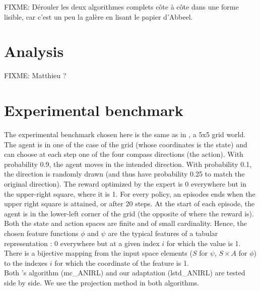 \documentclass{article}
\begin{document}

FIXME: Dérouler les deux algorithmes complets côte à côte dans une forme lisible, car c'est un peu la galère en lisant le papier d'Abbeel.
\section{Analysis}
FIXME: Matthieu ?
\section{Experimental benchmark}
The experimental benchmark chosen here is the same as in \citep{ng2000algorithms}, a 5x5 grid world. The agent is in one of the case of the grid (whose coordinates is the state) and can choose at each step one of the four compass directions (the action). With probability 0.9, the agent moves in the intended direction. With probability 0.1, the direction is randomly drawn (and thus have probability 0.25 to match the original direction). The reward optimized by the expert is 0 everywhere but in the upper-right square, where it is 1. For every policy, an episodes ends when the upper right square is attained, or after 20 steps. At the start of each episode, the agent is in the lower-left corner of the grid (the opposite of where the reward is).\\

Both the state and action spaces are finite and of small cardinality. Hence, the chosen feature functions $\phi$ and $\psi$ are the typical features of a tabular representation : 0 everywhere but at a given index $i$ for which the value is 1. There is a bijective mapping from the input space elements ($S$ for $\psi$, $S \times A$ for $\phi$) to the indexes $i$ for which the coordinate of the feature is 1.\\

Both \citet{abbeel2004apprenticeship}'s algorithm (mc\_ANIRL) and our adaptation (lstd\_ANIRL) are tested side by side. We use the projection method in both algorithms.\\
\end{document}
